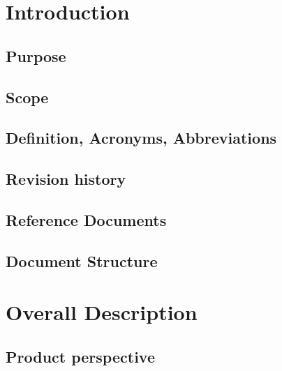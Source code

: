 \documentclass{/D:/Users/corsair-dragon/Documents/Github - Mario/CelaCelaCogollo/RASD/LaTeXCode/src/Configuration_Files/PoliMi3i_thesis.cls}
\begin{document}
    \mainmatter %


    \chapter{Introduction}\label{ch:introduction}
    


    \section{Purpose}\label{sec:purpose}


    \section{Scope}\label{sec:scope}


    \section{Definition, Acronyms, Abbreviations}\label{sec:definition_acronyms_abbreviations}


    \section{Revision history}\label{sec:revision_history}


    \section{Reference Documents}\label{sec:reference_documents}


    \section{Document Structure}\label{sec:document_structure}


    \chapter{Overall Description}\label{ch:overall_description}


    \section{Product perspective}\label{sec:product_perspective}
\end{document}

